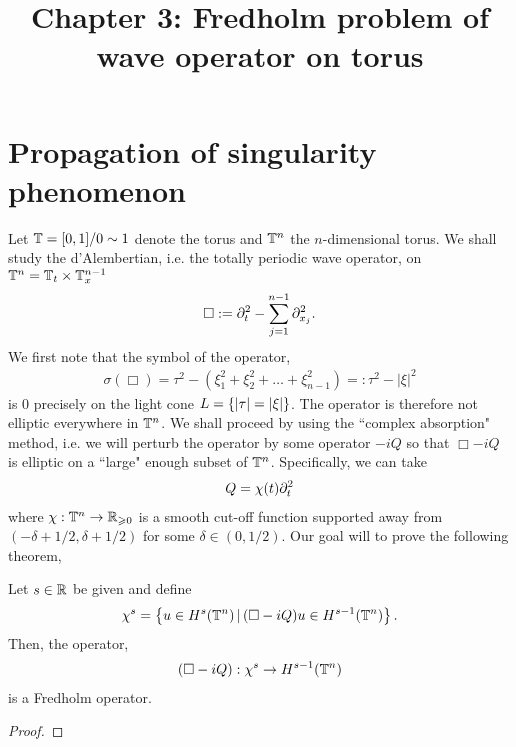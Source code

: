 \documentclass[12pt]{article}
\title{Chapter 3: Fredholm problem of wave operator on torus}
\date{}
\begin{document}
\maketitle
\section{Propagation of singularity phenomenon} 



Let ${\mathbb T} = [0,1] / 0 \sim 1$ denote the torus and ${\mathbb T}^n$ the $n$-dimensional torus. We shall study the d'Alembertian, i.e. the totally periodic wave operator, on ${\mathbb T}^n = {\mathbb T}_t \times {\ensuremath {\mathbb T}}_x^{n - 1}$ 
\begin{align}\label{eq: d'Alembertian}
    \Box := \partial_t^2 - \sum_{j = 1}^{n -1} \partial_{x_j}^2. 
\end{align}
We first note that the symbol of the operator, 
\begin{align*}
    \sigma(\Box) = \tau^2 - (\xi_1^2 + \xi_2^2 + \dots + \xi_{n -1}^2) =: \tau^2 - |\xi|^2
\end{align*}
is $0$ precisely on the light cone $L = \left\{|\tau| = |\xi|\right\}$. The operator is therefore not elliptic everywhere in ${\mathbb T}^n$.  We shall proceed by using the ``complex absorption" method, i.e. we will perturb the operator by some operator $-iQ$ so that $\Box - iQ$ is elliptic on a ``large" enough subset of ${\mathbb T}^n$. Specifically, we can take 
\begin{align}\label{eq: perturbation operator}
    Q = \chi(t)\partial_t^2
\end{align}
where $\chi: {\mathbb T}^n \to {\ensuremath {\mathbb R}}_{\geqslant 0}$ is a smooth cut-off function supported away from $(-\delta + 1/2, \delta + 1/2)$ for some $\delta \in (0, 1/2)$. Our goal will to prove the following theorem, 
\begin{ftheorem}
    Let $s \in {\ensuremath {\mathbb R}}$ be given and define 
    \begin{align*}
        \chi^s = \left\{u \in H^s({\mathbb T}^n) \, | \, (\Box - i Q)u \in H^{s - 1}({\mathbb T}^n)\right\}. 
    \end{align*}
    Then, the operator, 
    \begin{align*}
        (\Box - iQ): \chi^s \to H^{s - 1}({\mathbb T}^n)
    \end{align*}
    is a Fredholm operator. 
\end{ftheorem}
\begin{proof}
    
\end{proof}
\end{document}
